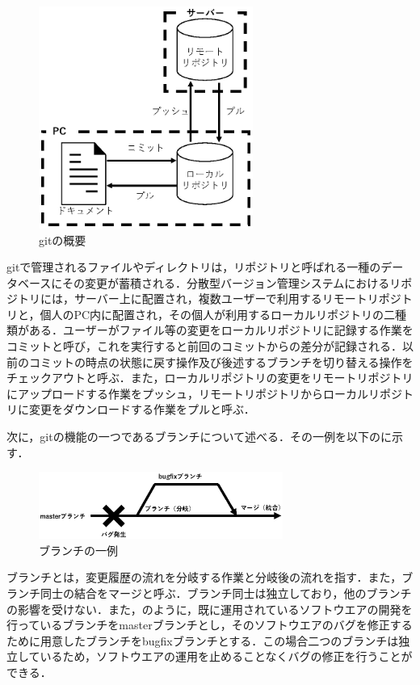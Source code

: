 \documentclass[a4paper,9pt,twocolumn]{jsarticle}
\begin{document}
\begin{figure}[h]
\centering
\includegraphics[width=70mm]{img/git.eps}
\caption{gitの概要}
\label{git}
\end{figure}

gitで管理されるファイルやディレクトリは，リポジトリと呼ばれる一種のデータベースにその変更が蓄積される．分散型バージョン管理システムにおけるリポジトリには，サーバー上に配置され，複数ユーザーで利用するリモートリポジトリと，個人のPC内に配置され，その個人が利用するローカルリポジトリの二種類がある．ユーザーがファイル等の変更をローカルリポジトリに記録する作業をコミットと呼び，これを実行すると前回のコミットからの差分が記録される．以前のコミットの時点の状態に戻す操作及び後述するブランチを切り替える操作をチェックアウトと呼ぶ．また，ローカルリポジトリの変更をリモートリポジトリにアップロードする作業をプッシュ，リモートリポジトリからローカルリポジトリに変更をダウンロードする作業をプルと呼ぶ．

次に，gitの機能の一つであるブランチについて述べる．その一例を以下のに示す．

\begin{figure}[h]
\centering
\includegraphics[width=80mm]{img/branch.eps}
\caption{ブランチの一例}
\label{branch}
\end{figure}

ブランチとは，変更履歴の流れを分岐する作業と分岐後の流れを指す．また，ブランチ同士の結合をマージと呼ぶ．ブランチ同士は独立しており，他のブランチの影響を受けない．また，のように，既に運用されているソフトウエアの開発を行っているブランチをmasterブランチとし，そのソフトウエアのバグを修正するために用意したブランチをbugfixブランチとする．この場合二つのブランチは独立しているため，ソフトウエアの運用を止めることなくバグの修正を行うことができる．
\end{document}
